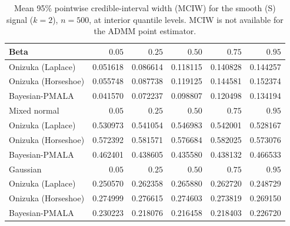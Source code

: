 \begin{table}[!htbp]
\centering
\small
\caption{Mean 95\% pointwise credible-interval width (MCIW) for the smooth (S) signal ($k=2$), $n=500$, at interior quantile levels. MCIW is not available for the ADMM point estimator.}
\label{tab:s_int_mciw}
\begin{tabular}{lrrrrr}
\toprule
Beta & $0.05$ & $0.25$ & $0.50$ & $0.75$ & $0.95$ \\
\midrule
Onizuka (Laplace) & 0.051618 & 0.086614 & 0.118115 & 0.140828 & 0.144257 \\
Onizuka (Horseshoe) & 0.055748 & 0.087738 & 0.119125 & 0.144581 & 0.152374 \\
Bayesian-PMALA & 0.041570 & 0.072237 & 0.098807 & 0.120498 & 0.134194 \\
\midrule
Mixed normal & $0.05$ & $0.25$ & $0.50$ & $0.75$ & $0.95$ \\
\midrule
Onizuka (Laplace) & 0.530973 & 0.541054 & 0.546983 & 0.542001 & 0.528167 \\
Onizuka (Horseshoe) & 0.572392 & 0.581571 & 0.576684 & 0.582025 & 0.573076 \\
Bayesian-PMALA & 0.462401 & 0.438605 & 0.435580 & 0.438132 & 0.466533 \\
\midrule
Gaussian & $0.05$ & $0.25$ & $0.50$ & $0.75$ & $0.95$ \\
\midrule
Onizuka (Laplace) & 0.250570 & 0.262358 & 0.265880 & 0.262720 & 0.248729 \\
Onizuka (Horseshoe) & 0.274999 & 0.276615 & 0.274603 & 0.273819 & 0.269150 \\
Bayesian-PMALA & 0.230223 & 0.218076 & 0.216458 & 0.218403 & 0.226720 \\
\bottomrule
\end{tabular}
\end{table}
